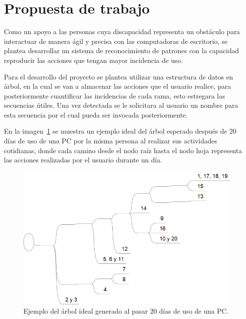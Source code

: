 \section{Propuesta de trabajo}

Como un apoyo a las personas cuya discapacidad representa un obstáculo para
 interactuar de manera ágil y precisa con las computadoras de escritorio, se
 plantea desarrollar un sistema de reconocimiento de patrones con la capacidad
 reproducir las acciones que tengan mayor incidencia de uso. 
 
Para el desarrollo del proyecto se plantea utilizar una estructura de datos en
 árbol, en la cual se van a almacenar las acciones que el usuario realice, para
 posteriormente cuantificar las incidencias de cada rama, esto estregara las
 secuencias útiles. Una vez detectada se le solicitara al usuario un nombre
 para esta secuencia por el cual pueda ser invocada posteriormente. 
 
En la imagen~\ref{fig:arbol} se muestra un ejemplo ideal del árbol esperado
 después de 20 días de uso de una PC por la misma persona al realizar sus
 actividades cotidianas, donde cada camino desde el nodo raíz hasta el nodo
 hoja representa las acciones realizadas por el usuario durante un día.
 
\begin{figure}[H]
\centering
\includegraphics[width=0.8\columnwidth]{CapituloI/Imagenes/Arbol.png}
\caption{Ejemplo del árbol ideal generado al pasar 20 días de uso de una PC.}
\label{fig:arbol}
\end{figure}